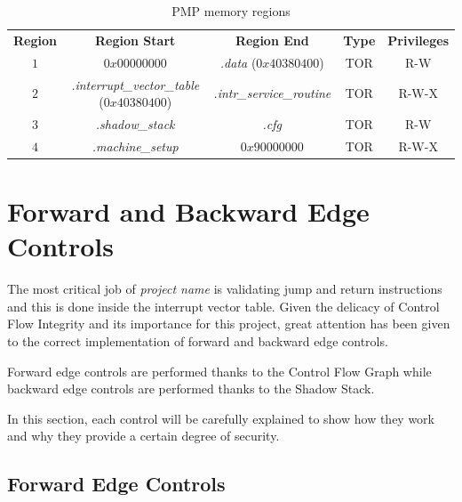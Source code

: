 \begin{table}
  \centering
  \begin{tabular}{|c|c|c|c|c|}
    \hline
    \textbf{Region}    & \textbf{Region Start}                             & \textbf{Region End}              & \textbf{Type} & \textbf{Privileges} \\
    \hhline{=====} $1$ & $0x00000000$                                      & \textit{.data} ($0x40380400$)    & TOR           & R-W                 \\
    \hline
    $2$                & \textit{.interrupt\_vector\_table} ($0x40380400$) & \textit{.intr\_service\_routine} & TOR           & R-W-X               \\
    \hline
    $3$                & \textit{.shadow\_stack}                           & \textit{.cfg}                    & TOR           & R-W                 \\
    \hline
    $4$                & \textit{.machine\_setup}                          & $0x90000000$                     & TOR           & R-W-X               \\
    \hline
  \end{tabular}
  \caption{PMP memory regions}
  \label{tab:pmpregions}
\end{table}

\section{Forward and Backward Edge Controls}
\label{sec:project_controls}

The most critical job of \textit{project name} is validating jump and return instructions
and this is done inside the interrupt vector table. Given the delicacy of
Control Flow Integrity and its importance for this project, great attention has been
given to the correct implementation of forward and backward edge controls.

Forward edge controls are performed thanks to the Control Flow Graph while backward
edge controls are performed thanks to the Shadow Stack.

In this section, each control will be carefully explained to show how they work
and why they provide a certain degree of security.

\subsection{Forward Edge Controls}
\label{subsec:forward}

